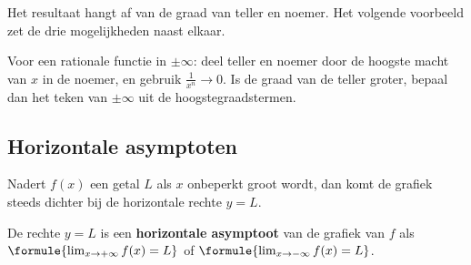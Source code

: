 \begin{oefeningen}
\end{oefeningen}

Het resultaat hangt af van de graad van teller en noemer. Het volgende voorbeeld zet de drie mogelijkheden naast elkaar.


\begin{werkwijze}
Voor een rationale functie in $\pm\infty$: deel teller en noemer door de hoogste macht van $x$ in de noemer, en gebruik $\frac{1}{x^n} \to 0$. Is de graad van de teller groter, bepaal dan het teken van $\pm\infty$ uit de hoogstegraadstermen.
\end{werkwijze}

\begin{oefeningen}
\end{oefeningen}

\subsection{Horizontale asymptoten}

Nadert $f(x)$ een getal $L$ als $x$ onbeperkt groot wordt, dan komt de grafiek steeds dichter bij de horizontale rechte $y = L$.

\begin{theorie}
De rechte $y = L$ is een \textbf{\textcolor{accent}{horizontale asymptoot}} van de grafiek van $f$ als $\formule{\lim_{x \to +\infty} f(x) = L}$ of $\formule{\lim_{x \to -\infty} f(x) = L}$.
\end{theorie}

